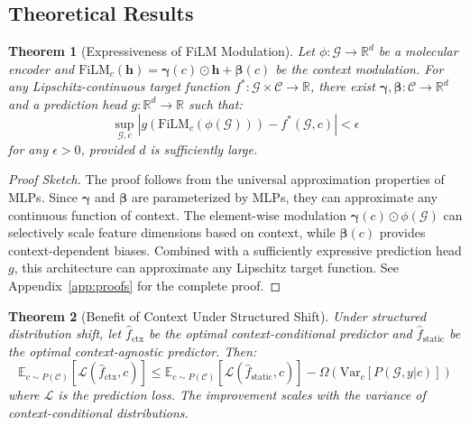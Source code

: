 \documentclass{article}
\newtheorem{theorem}{Theorem}
\begin{document}
\subsection{Theoretical Results}

\begin{theorem}[Expressiveness of FiLM Modulation]
\label{thm:expressiveness}
Let $\phi: \mathcal{G} \rightarrow \mathbb{R}^d$ be a molecular encoder and $\text{FiLM}_c(\mathbf{h}) = \boldsymbol{\gamma}(c) \odot \mathbf{h} + \boldsymbol{\beta}(c)$ be the context modulation. For any Lipschitz-continuous target function $f^*: \mathcal{G} \times \mathcal{C} \rightarrow \mathbb{R}$, there exist $\boldsymbol{\gamma}, \boldsymbol{\beta}: \mathcal{C} \rightarrow \mathbb{R}^d$ and a prediction head $g: \mathbb{R}^d \rightarrow \mathbb{R}$ such that:
\begin{equation}
    \sup_{\mathcal{G}, c} \left| g(\text{FiLM}_c(\phi(\mathcal{G}))) - f^*(\mathcal{G}, c) \right| < \epsilon
\end{equation}
for any $\epsilon > 0$, provided $d$ is sufficiently large.
\end{theorem}

\begin{proof}[Proof Sketch]
The proof follows from the universal approximation properties of MLPs. Since $\boldsymbol{\gamma}$ and $\boldsymbol{\beta}$ are parameterized by MLPs, they can approximate any continuous function of context. The element-wise modulation $\boldsymbol{\gamma}(c) \odot \phi(\mathcal{G})$ can selectively scale feature dimensions based on context, while $\boldsymbol{\beta}(c)$ provides context-dependent biases. Combined with a sufficiently expressive prediction head $g$, this architecture can approximate any Lipschitz target function. See Appendix~\ref{app:proofs} for the complete proof.
\end{proof}

\begin{theorem}[Benefit of Context Under Structured Shift]
\label{thm:benefit}
Under structured distribution shift, let $\hat{f}_{\text{ctx}}$ be the optimal context-conditional predictor and $\hat{f}_{\text{static}}$ be the optimal context-agnostic predictor. Then:
\begin{equation}
    \mathbb{E}_{c \sim P(\mathcal{C})} \left[ \mathcal{L}(\hat{f}_{\text{ctx}}, c) \right] \leq \mathbb{E}_{c \sim P(\mathcal{C})} \left[ \mathcal{L}(\hat{f}_{\text{static}}, c) \right] - \Omega\left( \text{Var}_c[P(\mathcal{G}, y | c)] \right)
\end{equation}
where $\mathcal{L}$ is the prediction loss. The improvement scales with the variance of context-conditional distributions.
\end{theorem}
\end{document}
